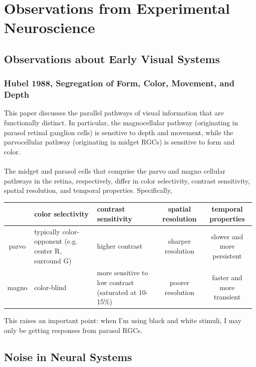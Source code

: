 \documentclass{article}
\begin{document}
\section{Observations from Experimental Neuroscience}
\subsection{Observations about Early Visual Systems}

\subsubsection{Hubel 1988, Segregation of Form, Color, Movement, and Depth}
This paper discusses the parallel pathways of visual information that are functionally distinct.  In particular, the magnocellular pathway (originating in parasol retinal ganglion cells) is sensitive to depth and movement, while the parvocellular pathway (originating in midget RGCs) is sensitive to form and color. \\
\\
The midget and parasol cells that comprise the parvo and magno cellular pathways in the retina, respectively, differ in color selectivity, contrast sensitivity, spatial resolution, and temporal properties.  Specifically, \\
\begin{tabular}{|c|p{4.5cm}|p{3.5cm}|c|c|} \hline
 	   & color selectivity & contrast sensitivity & spatial resolution & temporal properties \\ \hline
 parvo & typically color-opponent (e.g. center R, surround G) & higher contrast & sharper resolution & slower and more persistent \\ \hline
 magno & color-blind & more sensitive to low contrast (saturated at 10-15\%) & poorer resolution & faster and more transient \\ \hline
\end{tabular}

This raises an important point: when I'm using black and white stimuli, I may only be getting responses from parasol RGCs. 



\subsection{Noise in Neural Systems}
\end{document}

